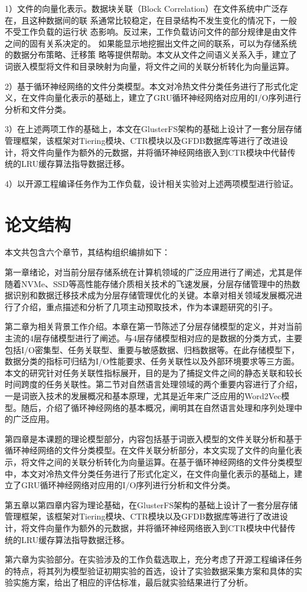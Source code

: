 1）文件的向量化表示。数据块关联（Block Correlation）在文件系统中广泛存在，且这种数据间的联 系通常比较稳定，在目录结构不发生变化的情况下，一般不受工作负载的运行状 态影响。反过来，工作负载访问文件的部分规律是由文件之间的固有关系决定的。 如果能显示地挖掘出文件之间的联系，可以为存储系统的数据分布策略、迁移策 略等提供帮助。本文从文件之间语义关系入手，建立了词嵌入模型将文件和目录映射为向量，将文件之间的关联分析转化为向量运算。

2）基于循环神经网络的文件分类模型。本文对冷热文件分类任务进行了形式化定义，在文件向量化表示的基础上，建立了GRU循环神经网络对应用的I/O序列进行分析和文件分类。

3）在上述两项工作的基础上，本文在GlusterFS架构的基础上设计了一套分层存储管理框架，该框架对Tiering模块、CTR模块以及GFDB数据库等进行了改进设计，将文件向量作为额外的元数据，并将循环神经网络嵌入到CTR模块中代替传统的LRU缓存算法指导数据迁移。





4）以开源工程编译任务作为工作负载，设计相关实验对上述两项模型进行验证。


\section{论文结构}
本文共包含六个章节，其结构组织编排如下：

第一章绪论，对当前分层存储系统在计算机领域的广泛应用进行了阐述，尤其是伴随着NVMe、SSD等高性能存储介质相关技术的飞速发展，分层存储管理中的热数据识别和数据迁移技术成为分层存储管理优化的关键。本章对相关领域发展概况进行了介绍，重点描述和分析了几项主动预取技术，作为本课题研究的引子。

第二章为相关背景工作介绍。本章在第一节陈述了分层存储模型的定义，并对当前主流的4层存储模型进行了阐述。与4层存储模型相对应的是数据的分类方式，主要包括I/O密集型、任务关联型、重要与敏感数据、归档数据等。在此存储模型下，数据分类的指标可归结为I/O性能要求、任务关联性以及外部环境要求等三方面。本文的研究针对任务关联性指标展开，目的是为了捕捉文件之间的静态关联和较长时间跨度的任务关联性。第二节对自然语言处理领域的两个重要内容进行了介绍，一是词嵌入技术的发展概况和基本原理，尤其是近年来广泛应用的Word2Vec模型。随后，介绍了循环神经网络的基本概况，阐明其在自然语言处理和序列处理中的广泛应用。

第四章是本课题的理论模型部分，内容包括基于词嵌入模型的文件关联分析和基于循环神经网络的文件分类模型。在文件关联分析部分，本文实现了文件的向量化表示，将文件之间的关联分析转化为向量运算。在基于循环神经网络的文件分类模型中，本文对冷热文件分类任务进行了形式化定义，在文件向量化表示的基础上，建立了GRU循环神经网络对应用的I/O序列进行分析和文件分类。


第五章以第四章内容为理论基础，在GlusterFS架构的基础上设计了一套分层存储管理框架，该框架对Tiering模块、CTR模块以及GFDB数据库等进行了改进设计，将文件向量作为额外的元数据，并将循环神经网络嵌入到CTR模块中代替传统的LRU缓存算法指导数据迁移。

第六章为实验部分。在实验涉及的工作负载选取上，充分考虑了开源工程编译任务的特点，将其列为模型验证初期实验的首选，设计了实验数据采集方案和具体的实验实施方案，给出了相应的评估标准，最后就实验结果进行了分析。